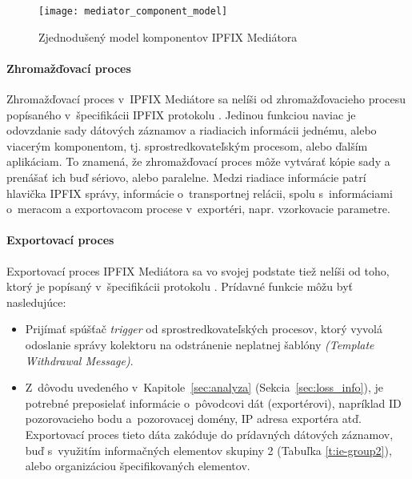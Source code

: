 \begin{figure}[ht!]
\centering
\texttt{[image: mediator\_component\_model]}
\caption{Zjednodušený model komponentov IPFIX Mediátora}\label{o:mediator_component_model}
\end{figure}


\paragraph{Zhromažďovací proces}

Zhromažďovací proces v~IPFIX Mediátore sa nelíši od zhromažďovacieho procesu popísaného
v~špecifikácii IPFIX protokolu \citep{rfc5101}.
Jedinou funkciou naviac je odovzdanie sady dátových záznamov a riadiacich informácii jednému, alebo 
viacerým komponentom, tj. sprostredkovateľským procesom, alebo ďalším aplikáciam. 
To znamená, že zhromažďovací proces môže vytvárať kópie sady a prenášať ich buď sériovo, alebo paralelne.  
Medzi riadiace informácie patrí hlavička IPFIX správy, informácie o~transportnej relácii, 
spolu s~informáciami o~meracom a exportovacom procese v~exportéri, napr. vzorkovacie parametre.

\paragraph{Exportovací proces} \label{sec:exporting_process}

Exportovací proces IPFIX Mediátora sa vo svojej podstate tiež nelíši od toho, ktorý je popísaný v~špecifikácii
protokolu \citep{rfc5101}.
Prídavné funkcie môžu byť nasledujúce:
\begin{itemize}
 \item Prijímať spúšťač \emph{trigger} od sprostredkovateľských procesov, ktorý vyvolá odoslanie správy
 kolektoru na odstránenie neplatnej šablóny \emph{(Template Withdrawal Message)}.
 \item Z~dôvodu uvedeného v~Kapitole~\ref{sec:analyza} (Sekcia~\ref{sec:loss_info}), je potrebné 
 preposielať informácie o~pôvodcovi dát (exportérovi), napríklad ID pozorovacieho bodu a~pozorovacej 
 domény, IP adresa exportéra atď. Exportovací proces tieto dáta zakóduje do prídavných dátových záznamov, 
 buď s~využitím 
 informačných elementov skupiny 2 (Tabuľka \ref{t:ie-group2}), alebo organizáciou špecifikovaných 
 elementov.
\end{itemize}

